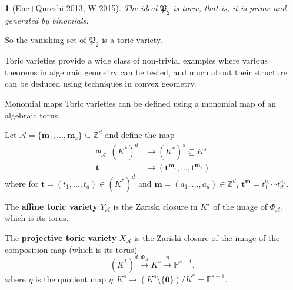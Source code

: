 \documentclass[mathserif,handout]{beamer}
\newcommand{\pr}{\mathfrak P}
\newcommand{\vect}[1]{\mathbf#1}
\newcommand{\Z}{\mathbb Z}
\newcommand{\Prj}{\mathbb P}
\theoremstyle{plain}
\newtheorem{thm}{\color{white}{Theorem}}[subsection]
\theoremstyle{definition}
\theoremstyle{remark}
\begin{document}
\begin{frame}
\begin{thm}[Ene+Qureshi 2013, W 2015]
The ideal $\pr_2$ is toric, that is, it is prime and generated by binomials.
\end{thm}  

\pause 
\vspace{0.75pc}
So the vanishing set of $\pr_2$ is a toric variety.

\pause 
\vspace{0.75pc}
Toric varieties provide a wide class of non-trivial examples where various theorems in algebraic geometry can be tested, and much about their structure can be deduced using techniques in convex geometry.
\end{frame}


\begin{frame}{Monomial maps}
Toric varieties can be defined using a monomial map of an algebraic torus.

\pause 
\vspace{0.75pc}
Let $\mathscr A=\{\vect m_1,\dots,\vect m_s\}\subseteq \Z^d$ and define the map
\begin{align*}
\Phi_{\mathscr A}: (K^*)^d &\to (K^*)^s\subseteq K^s \\
\vect t &\mapsto (\vect t^{\vect m_1},\dots,\vect t^{\vect m_s})
\end{align*}
where for $\vect t=(t_1,\dots,t_d)\in (K^*)^d$ and $\vect m=(a_1,\dots,a_d)\in \Z^d$, $\vect t^{\vect m}=t_1^{a_1}\cdots t_d^{a_d}$.
\end{frame}

\begin{frame}
The \textbf{affine toric variety} $Y_{\mathscr A}$ is the Zariski closure in $K^s$ of the image of $\Phi_{\mathscr A}$, which is its torus.

\pause
\vspace{0.75pc}
The \textbf{projective toric variety} $X_{\mathscr A}$ is the Zariski closure of the image of the composition map (which is its torus)
\[(K^\ast)^d\xrightarrow{\Phi_{\mathscr{A}}}K^s\xrightarrow{\eta}\Prj^{s-1},\]
where $\eta$ is the quotient map $\eta: K^s\to (K^s\setminus \{\vect 0\})/K^*=\Prj^{s-1}$.
\end{frame}
\end{document}
